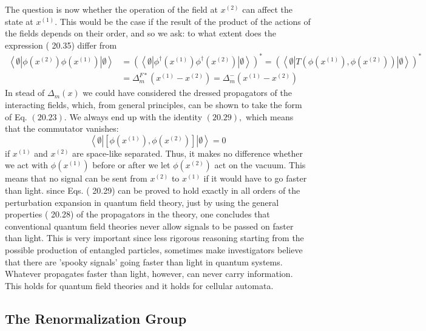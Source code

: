 \documentclass[main.tex]{subfiles}
\begin{document}
The question is now whether the operation of the field at $x^{(2)}$ can affect the state
at $x^{(1)} .$ This would be the case if the result of the product of the actions of the fields depends on their order, and so we ask: to what extent does the expression ( 20.35) differ from
$$
\begin{aligned}
\left\langle\emptyset\left|\phi\left(x^{(2)}\right) \phi\left(x^{(1)}\right)\right| \emptyset\right\rangle &=\left(\left\langle\emptyset\left|\phi^{\dagger}\left(x^{(1)}\right) \phi^{\dagger}\left(x^{(2)}\right)\right| \emptyset\right\rangle\right)^{*}=\left(\left\langle\emptyset\left|T\left(\phi\left(x^{(1)}\right), \phi\left(x^{(2)}\right)\right)\right| \emptyset\right\rangle\right)^{*} \\
&=\Delta_{m}^{F *}\left(x^{(1)}-x^{(2)}\right)=\Delta_{m}^{-}\left(x^{(1)}-x^{(2)}\right)
\end{aligned}
$$
In stead of $\Delta_{m}(x)$ we could have considered the dressed propagators of the interacting fields, which, from general principles, can be shown to take the form of Eq. $(20.23) .$ We always end up with the identity $(20.29),$ which means that the commutator vanishes:
$$
\left\langle\emptyset\left|\left[\phi\left(x^{(1)}\right), \phi\left(x^{(2)}\right)\right]\right| \emptyset\right\rangle= 0
$$
if $x^{(1)}$ and $x^{(2)}$ are space-like separated. Thus, it makes no difference whether we act with $\phi\left(x^{(1)}\right)$ before or after we let $\phi\left(x^{(2)}\right)$ act on the vacuum. This means that no signal can be sent from $x^{(2)}$ to $x^{(1)}$ if it would have to go faster than light. since Eqs. ( 20.29) can be proved to hold exactly in all orders of the perturbation expansion in quantum field theory, just by using the general properties ( 20.28) of the propagators in the theory, one concludes that conventional quantum field theories never allow signals to be passed on faster than light. This is very important since less rigorous reasoning starting from the possible production of entangled particles, sometimes make investigators believe that there are 'spooky signals' going faster than light in quantum systems. Whatever propagates faster than light, however, can never carry information. This holds for quantum field theories and it holds for cellular automata.


\subsection{The Renormalization Group}\label{ch20.8}
\end{document}
